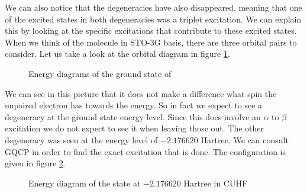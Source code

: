 We can also notice that the degeneracies have also disappeared, meaning that one of the excited states in both degeneracies was a triplet excitation. We can explain this by looking 
at the specific excitations that contribute to these excited states. When we think of the  molecule in STO-3G basis, there are three orbital pairs to consider. Let us take a 
look at the orbital diagram in figure \ref{fig:energydiag1}.
\begin{figure}[H]
  \begin{center}
  \end{center}
  \caption{Energy diagrams of the ground state of }
  \label{fig:energydiag1}
\end{figure}
We can see in this picture that it does not make a difference what spin the unpaired electron has towards the energy. So in fact we expect to see a degeneracy at the ground state
energy level. Since this does involve an $\alpha$ to $\beta$ excitation we do not expect to see it when leaving those out. The other degeneracy was seen at the energy level of $-2.176620$
Hartree. We can consult GQCP in order to find the exact excitation that is done. The configuration is given in figure \ref{fig:energydiag2}.
\begin{figure}[H]
  \begin{center}
  \end{center}
  \caption{Energy diagram of the state at $-2.176620$ Hartree in CUHF}
  \label{fig:energydiag2}
\end{figure}
